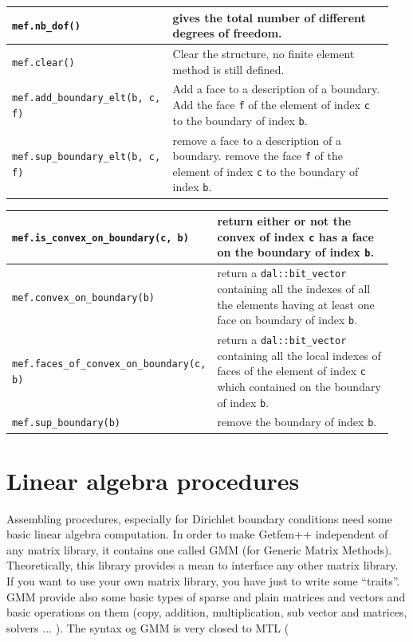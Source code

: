 \documentclass[11pt,a4paper]{article}
\begin{document}
\begin{center}
\begin{tabular}{|m{0.4\linewidth}|m{0.55\linewidth}|}
  {\tt mef.nb\_dof()} & gives the total number of different degrees of freedom.  \\ \hline

  {\tt mef.clear()} & Clear the structure, no finite element method is still defined.  \\ \hline

  {\tt mef.add\_boundary\_elt(b, c, f)} & Add a face to a description of a boundary. Add the face {\tt f} of the element of index {\tt c} to the boundary of index {\tt b}.  \\ \hline
  
  {\tt mef.sup\_boundary\_elt(b, c, f)} & remove a face to a description of a boundary. remove the face {\tt f} of the element of index {\tt c} to the boundary of index {\tt b}.  \\ \hline
\end{tabular} \end{center}

\begin{center} \begin{tabular}{|m{0.4\linewidth}|m{0.55\linewidth}|} \hline
  
  {\tt mef.is\_convex\_on\_boundary(c, b)} & return either or not the convex of index {\tt c}  has a face on the boundary of index {\tt b}.  \\ \hline
  
  {\tt mef.convex\_on\_boundary(b)} & return a {\tt dal::bit\_vector} containing all the indexes of all the elements having at least one face on boundary of index {\tt b}.  \\ \hline

  {\tt mef.faces\_of\_convex\_on\_boundary(c, b) } & return a {\tt dal::bit\_vector} containing all the local indexes of faces of the element of index {\tt c} which contained on the boundary of index {\tt b}.  \\ \hline

  {\tt mef.sup\_boundary(b) } & remove the boundary of index {\tt b}.  \\ \hline

\end{tabular} \end{center}

\section{Linear algebra procedures}

Assembling procedures, especially for Dirichlet boundary conditions need some basic linear algebra computation. In order to make {\sc Getfem++} independent of any matrix library, it contains one called GMM (for Generic Matrix Methods). Theoretically, this library provides a mean to interface any other matrix library. If you want to use your own matrix library, you have just to write some ``traits''. GMM provide also some basic types of sparse and plain matrices and vectors and basic operations on them (copy, addition, multiplication, sub vector and matrices, solvers ... ). The syntax og GMM is very closed to MTL (
\end{document}
